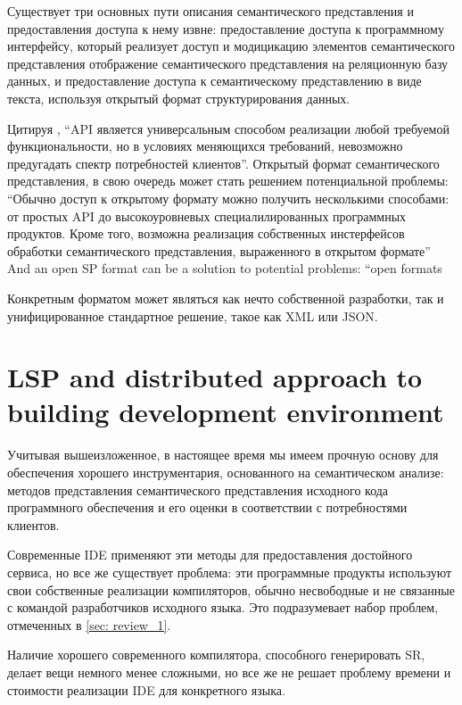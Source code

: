Существует три основных пути описания семантического представления и предоставления доступа к нему извне:
предоставление доступа к программному интерфейсу, который реализует доступ и модицикацию элементов семантического представления\cite{Cannon, FreeSoftwareFoundation2016}
отображение семантического представления на реляционную базу данных\cite{Linton1983},
и предоставление доступа к семантическому представлению в виде текста, используя открытый формат структурирования данных\cite{TheRustTeam2016}.

Цитируя \cite{Zouev2005}, ``API является универсальным способом реализации любой требуемой функциональности, 
но в условиях меняющихся требований, невозможно предугадать спектр потребностей клиентов''.
Открытый формат семантического представления, в свою очередь может стать решением потенциальной проблемы: ``Обычно доступ к открытому формату можно получить несколькими способами:
от простых API до высокоуровневых специалилированных программных продуктов. Кроме того, возможна реализация собственных инстерфейсов обработки семантического представления, выраженного в открытом формате''
And an open SP format can be a solution to potential problems: ``open formats

Конкретным форматом может являться как нечто собственной разработки, так и унифицированное стандартное решение, 
такое как XML\cite{Germon} или JSON\cite{ECMA-4042013}.

\newpage
\section{LSP and distributed approach to building development environment}
\label{sec:review_3}
Учитывая вышеизложенное, в настоящее время мы имеем прочную основу для обеспечения хорошего инструментария, 
основанного на семантическом анализе: методов представления семантического представления исходного кода программного обеспечения 
и его оценки в соответствии с потребностями клиентов.

Современные IDE применяют эти методы для предоставления достойного сервиса, но все же существует проблема: 
эти программные продукты используют свои собственные реализации компиляторов, обычно несвободные и не связанные с командой разработчиков исходного языка. 
Это подразумевает набор проблем, отмеченных в \ref{sec: review_1}.

Наличие хорошего современного компилятора, способного генерировать SR, делает вещи немного менее сложными, 
но все же не решает проблему времени и стоимости реализации IDE для конкретного языка.

